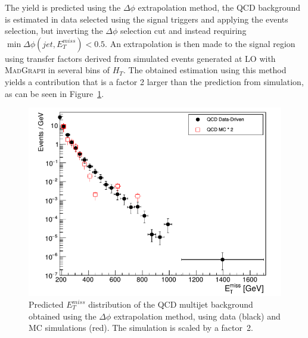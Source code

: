 The yield is predicted using 
the $\Delta\phi$ extrapolation method, the QCD background is estimated in data selected using the signal triggers and applying the events selection, but inverting the $\Delta\phi$ selection cut and instead requiring $\min\Delta\phi(jet, E_T^{miss}) < 0.5$. An extrapolation is then made to the signal region using transfer factors derived from simulated events generated at \ac{LO} with \textsc{MadGraph} in several bins of $H_T$. The obtained estimation using this method yields a contribution that is a factor 2 larger than the prediction from simulation, 
as can be seen in Figure~\ref{fig:QCD_prediction}.

\begin{figure}[ht]
  \centering
 \includegraphics[width=.7\textwidth]{QCD_prediction.png} 
 \caption{Predicted $E_T^{miss}$ distribution of the QCD multijet background obtained using the $\Delta\phi$ extrapolation method, using data (black) and MC simulations (red). The simulation is scaled by a factor~2.}
 \label{fig:QCD_prediction}
\end{figure}



